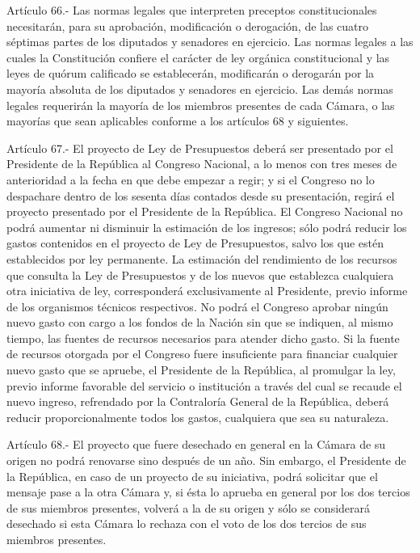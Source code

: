     Artículo 66.- Las normas legales que interpreten preceptos constitucionales necesitarán, para su aprobación, modificación o derogación, de las cuatro séptimas partes de los diputados y senadores en ejercicio.
    Las normas legales a las cuales la Constitución confiere el carácter de ley orgánica constitucional y las leyes de quórum calificado se establecerán, modificarán o derogarán por la mayoría absoluta de los diputados y senadores en ejercicio.
    Las demás normas legales requerirán la mayoría de los miembros presentes de cada Cámara, o las mayorías que sean aplicables conforme a los artículos 68 y siguientes.





    Artículo 67.- El proyecto de Ley de Presupuestos deberá ser presentado por el Presidente de la República al Congreso Nacional, a lo menos con tres meses de anterioridad a la fecha en que debe empezar a regir; y si el Congreso no lo despachare dentro de los sesenta días contados desde su presentación, regirá el proyecto presentado por el Presidente de la República.
    El Congreso Nacional no podrá aumentar ni disminuir la estimación de los ingresos; sólo podrá reducir los gastos contenidos en el proyecto de Ley de Presupuestos, salvo los que estén establecidos por ley permanente.
    La estimación del rendimiento de los recursos que consulta la Ley de Presupuestos y de los nuevos que establezca cualquiera otra iniciativa de ley, corresponderá exclusivamente al Presidente, previo informe de los organismos técnicos respectivos.
    No podrá el Congreso aprobar ningún nuevo gasto con cargo a los fondos de la Nación sin que se indiquen, al mismo tiempo, las fuentes de recursos necesarios para atender dicho gasto.
    Si la fuente de recursos otorgada por el Congreso fuere insuficiente para financiar cualquier nuevo gasto que se apruebe, el Presidente de la República, al promulgar la ley, previo informe favorable del servicio o institución a través del cual se recaude el nuevo ingreso, refrendado por la Contraloría General de la República, deberá reducir proporcionalmente todos los gastos, cualquiera que sea su naturaleza.



    Artículo 68.- El proyecto que fuere desechado en general en la Cámara de su origen no podrá renovarse sino después de un año. Sin embargo, el Presidente de la República, en caso de un proyecto de su iniciativa, podrá solicitar que el mensaje pase a la otra Cámara y, si ésta lo aprueba en general por los dos tercios de sus miembros presentes, volverá a la de su origen y sólo se considerará desechado si esta Cámara lo rechaza con el voto de los dos tercios de sus miembros presentes.



